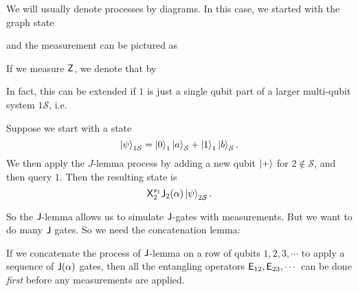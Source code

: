 We will usually denote processes by diagrams. In this case, we started with the graph state
\begin{center}
\end{center}
and the measurement can be pictured as
\begin{center}
\end{center}
If we measure $\mathsf{Z}$, we denote that by
\begin{center}
\end{center}
In fact, this can be extended if $1$ is just a single qubit part of a larger multi-qubit system $1\mathcal{S}$, i.e.
\begin{lemma}
  Suppose we start with a state
  \[
    \left\lvert \psi\right\rangle_{1\mathcal{S}} = \left\lvert 0\right\rangle_1\left\lvert a\right\rangle_\mathcal{S} + \left\lvert 1\right\rangle_1 \left\lvert b\right\rangle_\mathcal{S}.
  \]
  We then apply the $J$-lemma process by adding a new qubit $\left\lvert +\right\rangle$ for $2 \not \in \mathcal{S}$, and then query $1$. Then the resulting state is
  \[
    \mathsf{X}_2^{s_1}\mathsf{J}_2(\alpha) \left\lvert \psi\right\rangle_{2\mathcal{S}}.
  \]
\end{lemma}
So the $\mathsf{J}$-lemma allows us to simulate $\mathsf{J}$-gates with measurements. But we want to do many $\mathsf{J}$ gates. So we need the concatenation lemma:
\begin{lemma}
  If we concatenate the process of $\mathsf{J}$-lemma on a row of qubits $1, 2, 3, \cdots$ to apply a sequence of $\mathsf{J}(\alpha)$ gates, then all the entangling operators $\mathsf{E}_{12}, \mathsf{E}_{23}, \cdots$ can be done \emph{first} before any measurements are applied.
\end{lemma}

